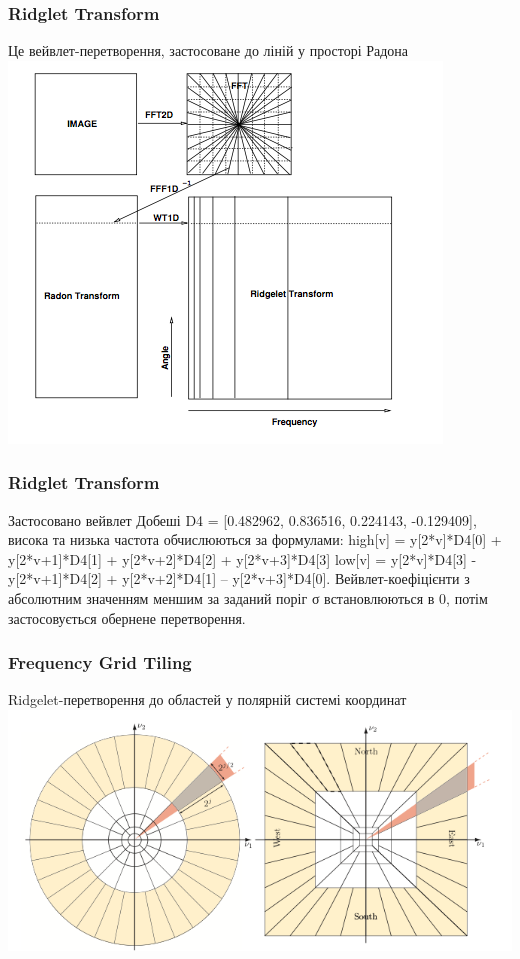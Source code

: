 \documentclass[12pt]{beamer}
\begin{document}
\begin{frame}\frametitle{Ridglet Transform }
	Це вейвлет-перетворення, застосоване до ліній у просторі Радона
	\includegraphics[scale=0.35]{images/ridgelet}	 
\end{frame}

\begin{frame}\frametitle{Ridglet Transform }
	Застосовано вейвлет Добеші D4 = [0.482962, 0.836516, 0.224143, -0.129409], висока та низька частота обчислюються за формулами: \linebreak
	high[v] = y[2*v]*D4[0] + y[2*v+1]*D4[1] + y[2*v+2]*D4[2] + y[2*v+3]*D4[3] \linebreak
	low[v] = y[2*v]*D4[3] - y[2*v+1]*D4[2] + y[2*v+2]*D4[1] – y[2*v+3]*D4[0]. \linebreak
	Вейвлет-коефіцієнти з абсолютним значенням меншим за заданий поріг σ встановлюються в 0, потім застосовується обернене перетворення.
\end{frame}

\begin{frame}\frametitle{Frequency Grid Tiling }
	Ridgelet-перетворення до областей у полярній системі координат \linebreak
	\includegraphics[scale=0.4]{images/grid_tiling} 
\end{frame}
\end{document}
